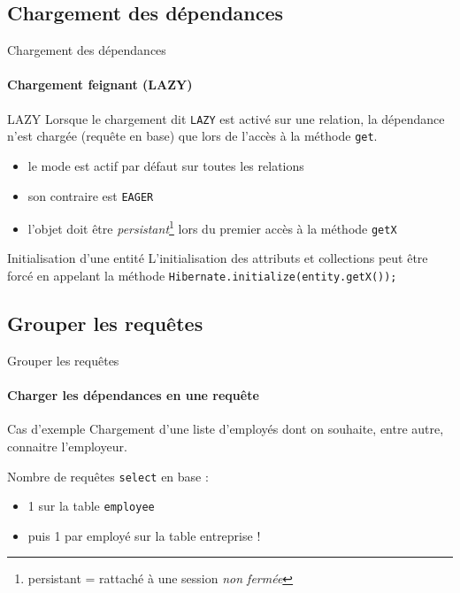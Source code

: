 \documentclass[compress]{beamer}%
\begin{document}
\subsection{Chargement des dépendances}
\begin{frame}{Chargement des dépendances}
	\framesubtitle{Chargement feignant (LAZY)}
	
	\begin{block}{LAZY}
	Lorsque le chargement dit \texttt{LAZY} est activé sur une relation, la dépendance n'est chargée (requête en base) que lors de l'accès à la méthode \texttt{get}.
	\end{block}
	
	\pause
	\begin{itemize}
	\item le mode est actif par défaut sur toutes les relations
	\item son contraire est \texttt{EAGER}
	\item l'objet doit être \emph{persistant}\footnote{persistant = rattaché à une session \emph{non fermée}} lors du premier accès à la méthode \texttt{getX}
	\end{itemize}
	
	\pause	
	\begin{block}{Initialisation d'une entité}
	L'initialisation des attributs et collections peut être forcé en appelant la méthode \texttt{Hibernate.initialize(entity.getX());}
	\end{block}
\end{frame}

\subsection{Grouper les requêtes}
\begin{frame}[fragile]{Grouper les requêtes}
	\framesubtitle{Charger les dépendances en une requête}
	
	\begin{exampleblock}{Cas d'exemple}	
	Chargement d'une liste d'employés dont on souhaite, entre autre, connaitre l'employeur.
	\end{exampleblock}
	
	\pause
	Nombre de requêtes \texttt{select} en base :
	\begin{itemize}
	\item 1 sur la table \texttt{employee}
	\item puis 1 par employé sur la table entreprise !
	\end{itemize}

\end{frame}
\end{document}
